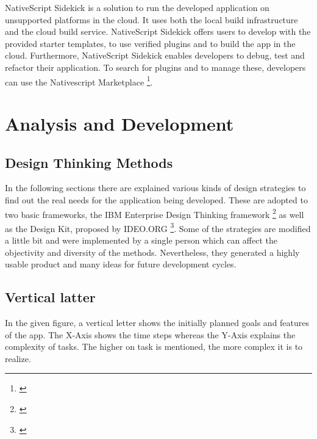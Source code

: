NativeScript Sidekick is a solution to run the developed application on unsupported platforms in the cloud. It uses both the local build infrastructure and the cloud build service. NativeScript Sidekick offers users to develop with the provided starter templates, to use verified plugins and to build the app in the cloud. Furthermore, NativeScript Sidekick enables developers to debug, test and refactor their application. 
To search for plugins and to manage these, developers can use the Nativescript Marketplace \footnote{\cite{nsmarket}}.


\section{Analysis and Development}

\subsection{Design Thinking Methods}

In the following sections there are explained various kinds of design strategies to find out the real needs for the application being developed. These are adopted to two basic frameworks, the IBM Enterprise Design Thinking framework \footnote{\cite{ibm_edt}} as well as the Design Kit, proposed by IDEO.ORG \footnote{\cite{design_kit}}. Some of the strategies are modified a little bit and were implemented by a single person which can affect the objectivity and diversity of the methods. Nevertheless, they generated a highly usable product and many ideas for future development cycles. 

\subsection{Vertical latter}

In the given figure, a vertical letter shows the initially planned goals and features of the app. The X-Axis shows the time steps whereas the Y-Axis explains the complexity of tasks. The higher on task is mentioned, the more complex it is to realize.

